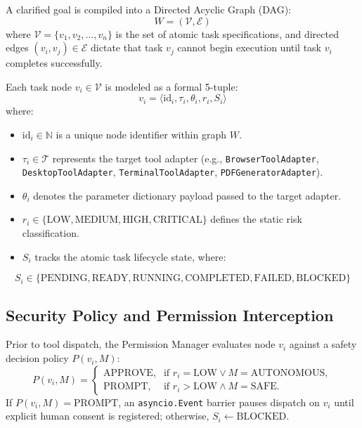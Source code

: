 \documentclass[conference]{IEEEtran}
\begin{document}
A clarified goal is compiled into a Directed Acyclic Graph (DAG):
\begin{equation}
W = (\mathcal{V}, \mathcal{E})
\end{equation}
where $\mathcal{V} = \{v_1, v_2, \dots, v_n\}$ is the set of atomic task specifications, and directed edges $(v_i, v_j) \in \mathcal{E}$ dictate that task $v_j$ cannot begin execution until task $v_i$ completes successfully.

Each task node $v_i \in \mathcal{V}$ is modeled as a formal 5-tuple:
\begin{equation}
v_i = \langle \text{id}_i, \tau_i, \theta_i, r_i, S_i \rangle
\end{equation}
where:
\begin{itemize}
    \item $\text{id}_i \in \mathbb{N}$ is a unique node identifier within graph $W$.
    \item $\tau_i \in \mathcal{T}$ represents the target tool adapter (e.g., \texttt{BrowserToolAdapter}, \texttt{DesktopToolAdapter}, \texttt{TerminalToolAdapter}, \texttt{PDFGeneratorAdapter}).
    \item $\theta_i$ denotes the parameter dictionary payload passed to the target adapter.
    \item $r_i \in \{\text{LOW}, \text{MEDIUM}, \text{HIGH}, \text{CRITICAL}\}$ defines the static risk classification.
    \item $S_i$ tracks the atomic task lifecycle state, where:
\end{itemize}
\begin{equation}
S_i \in \{\text{PENDING}, \text{READY}, \text{RUNNING}, \text{COMPLETED}, \text{FAILED}, \text{BLOCKED}\}
\end{equation}

\subsection{Security Policy and Permission Interception}
Prior to tool dispatch, the Permission Manager evaluates node $v_i$ against a safety decision policy $P(v_i, M)$:
\begin{equation}
P(v_i, M) = \begin{cases}
\text{APPROVE}, & \text{if } r_i = \text{LOW} \lor M = \text{AUTONOMOUS}, \\
\text{PROMPT}, & \text{if } r_i > \text{LOW} \land M = \text{SAFE}.
\end{cases}
\end{equation}
If $P(v_i, M) = \text{PROMPT}$, an \texttt{asyncio.Event} barrier pauses dispatch on $v_i$ until explicit human consent is registered; otherwise, $S_i \leftarrow \text{BLOCKED}$.
\end{document}
